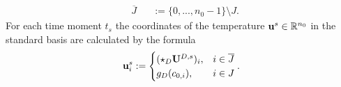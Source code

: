 \begin{algorithm}
\begin{enumerate}
\begin{subequations}
\begin{alignat}{2}
          & \overline{J}
          && := \{0, ..., n_0 - 1\} \setminus J.
        \end{alignat}
      \end{subequations}
      For each time moment $t_s$ the coordinates of the temperature
      ${\bf u}^s \in \mathbb{R}^{n_0}$
      in the standard basis are calculated by the formula
      \begin{equation}
        {\bf u}^s_i :=
        \begin{cases}
          ({\bf \star}_D {\bf U}^{D, s})_i, & i \in \overline{J} \\
          g_D(c_{0, i}), & i \in J
        \end{cases}.
      \end{equation}
  \end{enumerate}
\end{algorithm}
